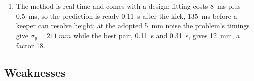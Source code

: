 \begin{enumerate}[label=S\arabic*,font=\bfseries,leftmargin=*,itemsep=3pt]
        values from \num{327} to \num{1.75}, prior shrinkages of \num{8.69},
        \num{69.99} and \num{72.65} per cent imply \num{5.27} data-determined
        parameters, so the six-parameter fit is the largest model the fixes
        can support without a prior.
  \item The method is real-time and comes with a design: fitting costs
        \SI{8}{ms} plus \SI{0.5}{ms}, so the prediction is ready
        \SI{0.11}{s} after the kick, \SI{135}{ms} before a keeper can resolve
        height; at the adopted \SI{5}{mm} noise the problem's timings give
        $\sigma_y=\SI{211}{mm}$ while the best pair, \SI{0.11}{s} and
        \SI{0.31}{s}, gives \SI{12}{mm}, a factor \num{18}.
\end{enumerate}

\subsection*{Weaknesses}

